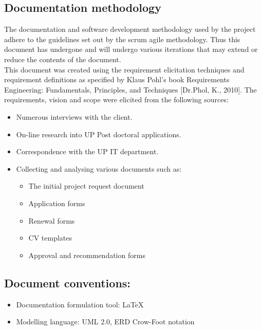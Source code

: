 \documentclass[12pt]{article}
\begin{document}
\subsection{Documentation methodology}
\vspace{0.2in}
\begin{flushleft}
The documentation and software development methodology used by the project adhere to the guidelines set out by the scrum agile methodology. Thus this document has undergone and will undergo various iterations that may extend or reduce the contents of the document.\\

This document was created using the requirement elicitation techniques and requirement definitions as specified by Klaus Pohl’s book Requirements Engineering: Fundamentals, Principles, and Techniques [Dr.Phol, K., 2010].
The requirements, vision and scope were elicited from the following sources:
\begin{itemize}
	\item Numerous interviews with the client.
	\item On-line research into UP Post doctoral applications.
	\item Correspondence with the UP IT department.
	\item Collecting and analysing various documents such as:
		\begin{itemize}
			\item The initial project request document
			\item Application forms
			\item Renewal forms
			\item CV templates
			\item Approval and recommendation forms
		\end{itemize}
\end{itemize}
\end{flushleft}	

\vspace{0.5in}

\subsection{Document conventions:}
\vspace{0.1in}
\begin{itemize}
\item Documentation formulation tool: LaTeX
\item Modelling language: UML 2.0, ERD Crow-Foot notation
\end{itemize}
\end{document}
